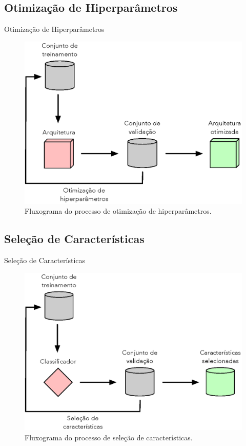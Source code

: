 \subsection{Otimização de Hiperparâmetros}
\label{ss.applications_hyperparameter}

\begin{frame}{Otimização de Hiperparâmetros}
	\begin{figure}
		\centering
		\includegraphics[scale=0.5]{figs/hyperparameter_opt.eps}	
		\caption{Fluxograma do processo de otimização de hiperparâmetros.}
		\label{f.hyperparameter_opt}
	\end{figure}
\end{frame}

\subsection{Seleção de Características}
\label{ss.applications_feature_selection}

\begin{frame}{Seleção de Características}
	\begin{figure}
		\centering
		\includegraphics[scale=0.5]{figs/feature_selection.eps}	
		\caption{Fluxograma do processo de seleção de características.}
		\label{f.feature_selection}
	\end{figure}
\end{frame}